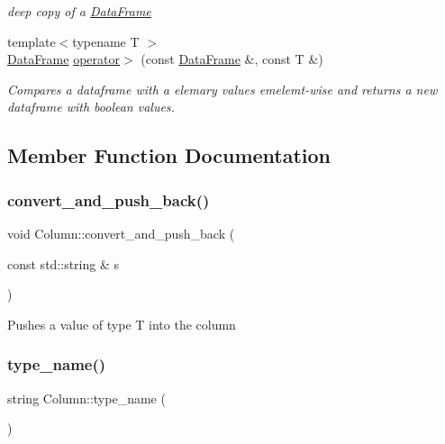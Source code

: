 \begin{DoxyCompactItemize}
\begin{DoxyCompactList}\small\item\em deep copy of a \hyperlink{classDataFrame}{Data\+Frame} \end{DoxyCompactList}\item 
\mbox{\label{classColumn_acd17a18489660c217522c8b39ed04867}} 
{\footnotesize template$<$typename T $>$ }\\\hyperlink{classDataFrame}{Data\+Frame} \hyperlink{classColumn_acd17a18489660c217522c8b39ed04867}{operator$>$} (const \hyperlink{classDataFrame}{Data\+Frame} \&, const T \&)
\begin{DoxyCompactList}\small\item\em Compares a dataframe with a elemary values emelemt-\/wise and returns a new dataframe with boolean values. \end{DoxyCompactList}\end{DoxyCompactItemize}


\subsection{Member Function Documentation}
\mbox{\label{classColumn_a9a318e80a0581ab65f1ec81499064bc4}} 
\subsubsection{\texorpdfstring{convert\+\_\+and\+\_\+push\+\_\+back()}{convert\_and\_push\_back()}}
{\footnotesize\ttfamily void Column\+::convert\+\_\+and\+\_\+push\+\_\+back (\begin{DoxyParamCaption}\item[{const std\+::string \&}]{s }\end{DoxyParamCaption})}

Pushes a value of type T into the column \mbox{\label{classColumn_a4e1088bc99d0408a533a2eadfbcdca23}} 
\subsubsection{\texorpdfstring{type\+\_\+name()}{type\_name()}}
{\footnotesize\ttfamily string Column\+::type\+\_\+name (\begin{DoxyParamCaption}{ }\end{DoxyParamCaption})}

